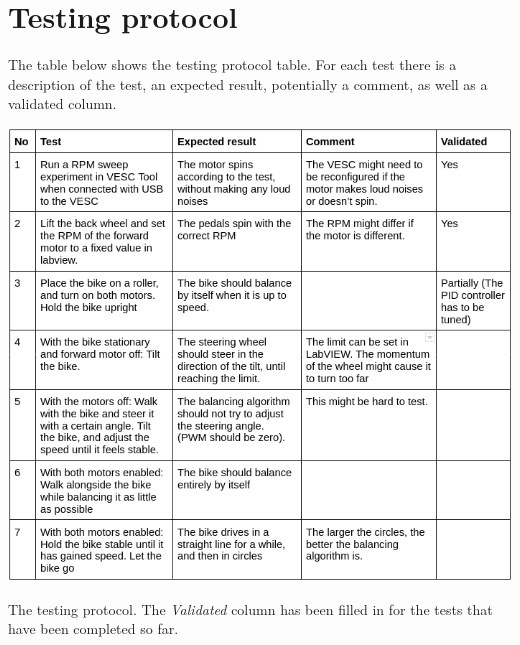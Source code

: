 \chapter{Testing protocol} \label{testingProtocol}

The table below shows the testing protocol table. For each test there is a description of the test, an expected result, potentially a comment, as well as a validated column.

\begin{table}[h]
    \centering
    \includegraphics[width=\textwidth]{figure/testing protocol.png}
    \caption{The testing protocol. The \textit{Validated} column has been filled in for the tests that have been completed so far.}
\end{table}